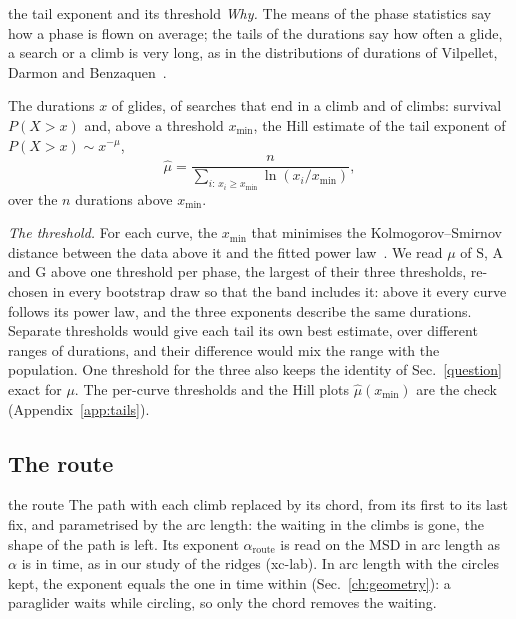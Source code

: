 \documentclass[10pt,a4paper]{article}
\newcommand{\G}{\mathrm{G}}
\newcommand{\A}{\mathrm{A}}
\newcommand{\Sl}{\mathrm{S}}
\begin{document}
\begin{method}{the tail exponent and its threshold}
  \emph{Why.} The means of the phase statistics say how a phase is flown on average; the tails of the durations
  say how often a glide, a search or a climb is very long, as in the distributions of durations of Vilpellet,
  Darmon and Benzaquen~\cite{vilpellet2026}.

  The durations $x$ of glides, of searches that end in a climb and of climbs: survival $P(X>x)$ and, above a
  threshold $x_\mathrm{min}$, the Hill estimate of the tail exponent of $P(X>x)\sim x^{-\mu}$,
  \[ \hat\mu=\frac{n}{\sum_{i:\,x_i\ge x_\mathrm{min}}\ln(x_i/x_\mathrm{min})}, \]
  over the $n$ durations above $x_\mathrm{min}$.

  \emph{The threshold.} For each curve, the $x_\mathrm{min}$ that minimises the Kolmogorov--Smirnov distance
  between the data above it and the fitted power law~\cite{clauset2009}. We read $\mu$ of $\Sl$, $\A$ and $\G$
  above one threshold per phase, the largest of their three thresholds, re-chosen in every bootstrap draw so
  that the band includes it: above it every curve follows its power law, and the three exponents describe the
  same durations. Separate thresholds would give each tail its own best estimate, over different ranges of
  durations, and their difference would mix the range with the population. One threshold for the three also
  keeps the identity of Sec.~\ref{question} exact for $\mu$. The per-curve thresholds and the Hill plots
  $\hat\mu(x_\mathrm{min})$ are the check (Appendix~\ref{app:tails}).
\end{method}

\subsection{The route}\label{route}

\begin{method}{the route}
  The path with each climb replaced by its chord, from its first to its last fix, and parametrised by the arc
  length: the waiting in the climbs is gone, the shape of the path is left. Its exponent $\alpha_\mathrm{route}$
  is read on the MSD in arc length as $\alpha$ is in time, as in our study of the ridges (xc-lab). In arc length
  with the circles kept, the exponent equals the one in time within \RouteCheckMax{} (Sec.~\ref{ch:geometry}): a
  paraglider waits while circling, so only the chord removes the waiting.
\end{method}
\end{document}
